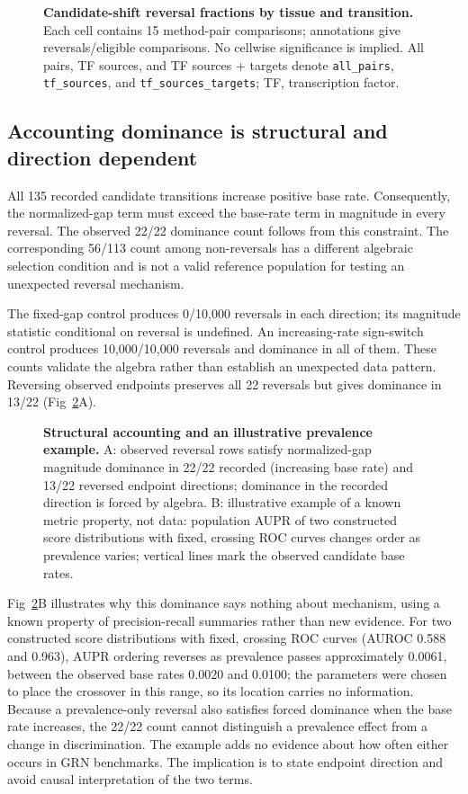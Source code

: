 \documentclass[10pt,letterpaper]{article}
\begin{document}
\begin{figure}[!ht]
\caption{{\bf Candidate-shift reversal fractions by tissue and transition.} Each cell contains 15 method-pair comparisons; annotations give reversals/eligible comparisons. No cellwise significance is implied. All pairs, TF sources, and TF sources + targets denote \texttt{all\_pairs}, \texttt{tf\_sources}, and \texttt{tf\_sources\_targets}; TF, transcription factor.}
\label{fig:candidate}
\end{figure}

\subsection*{Accounting dominance is structural and direction dependent}
All 135 recorded candidate transitions increase positive base rate. Consequently, the normalized-gap term must exceed the base-rate term in magnitude in every reversal. The observed 22/22 dominance count follows from this constraint. The corresponding 56/113 count among non-reversals has a different algebraic selection condition and is not a valid reference population for testing an unexpected reversal mechanism.

The fixed-gap control produces 0/10{,}000 reversals in each direction; its magnitude statistic conditional on reversal is undefined. An increasing-rate sign-switch control produces 10{,}000/10{,}000 reversals and dominance in all of them. These counts validate the algebra rather than establish an unexpected data pattern. Reversing observed endpoints preserves all 22 reversals but gives dominance in 13/22 (Fig~\ref{fig:magnitude}A).

\begin{figure}[!ht]
\caption{{\bf Structural accounting and an illustrative prevalence example.} A: observed reversal rows satisfy normalized-gap magnitude dominance in 22/22 recorded (increasing base rate) and 13/22 reversed endpoint directions; dominance in the recorded direction is forced by algebra. B: illustrative example of a known metric property, not data: population AUPR of two constructed score distributions with fixed, crossing ROC curves changes order as prevalence varies; vertical lines mark the observed candidate base rates.}
\label{fig:magnitude}
\end{figure}

Fig~\ref{fig:magnitude}B illustrates why this dominance says nothing about mechanism, using a known property of precision-recall summaries rather than new evidence. For two constructed score distributions with fixed, crossing ROC curves (AUROC 0.588 and 0.963), AUPR ordering reverses as prevalence passes approximately 0.0061, between the observed base rates 0.0020 and 0.0100; the parameters were chosen to place the crossover in this range, so its location carries no information. Because a prevalence-only reversal also satisfies forced dominance when the base rate increases, the 22/22 count cannot distinguish a prevalence effect from a change in discrimination. The example adds no evidence about how often either occurs in GRN benchmarks. The implication is to state endpoint direction and avoid causal interpretation of the two terms.
\end{document}

